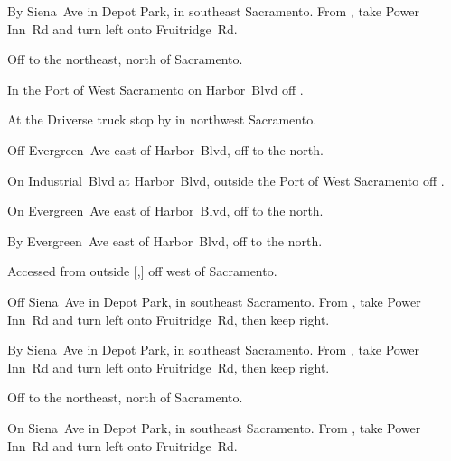 
\begin{LocationList}

By Siena~Ave in Depot Park, in southeast Sacramento.
From , take  Power Inn~Rd and turn left onto Fruitridge~Rd.

Off   to the northeast, north of Sacramento.

In the Port of West Sacramento on Harbor~Blvd off .

At the Driverse truck stop by   in northwest Sacramento.

Off Evergreen~Ave east of Harbor~Blvd, off  to the north.

On Industrial~Blvd at Harbor~Blvd, outside the Port of West Sacramento off .

\Location{\GarageHQ \Garage}
On Evergreen~Ave east of Harbor~Blvd, off  to the north.

By Evergreen~Ave east of Harbor~Blvd, off  to the north.

Accessed from  outside [,] off  west of Sacramento.

Off Siena~Ave in Depot Park, in southeast Sacramento.
From , take  Power Inn~Rd and turn left onto Fruitridge~Rd, then keep right.

By Siena~Ave in Depot Park, in southeast Sacramento.
From , take  Power Inn~Rd and turn left onto Fruitridge~Rd, then keep right.

Off   to the northeast, north of Sacramento.

On Siena~Ave in Depot Park, in southeast Sacramento.
From , take  Power Inn~Rd and turn left onto Fruitridge~Rd.

\end{LocationList}
